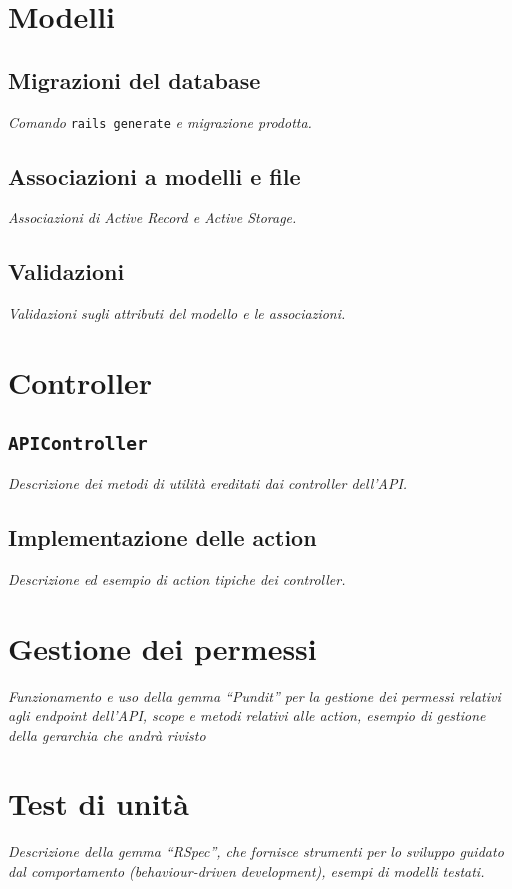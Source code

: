 \section{Modelli}
\subsection{Migrazioni del database}
\emph{Comando} \texttt{rails generate} \emph{e migrazione prodotta.}

\subsection{Associazioni a modelli e file}
\emph{Associazioni di Active Record e Active Storage.}

\subsection{Validazioni}
\emph{Validazioni sugli attributi del modello e le associazioni.}

\section{Controller}
\subsection{\texttt{APIController}}
\emph{Descrizione dei metodi di utilità ereditati dai controller dell'API.}

\subsection{Implementazione delle action}
\emph{Descrizione ed esempio di action tipiche dei controller.}

\section{Gestione dei permessi}
\emph{Funzionamento e uso della gemma ``Pundit'' per la gestione dei permessi relativi agli endpoint dell'API, scope e metodi relativi alle action, esempio di gestione della gerarchia che andrà rivisto}

\section{Test di unità}
\emph{Descrizione della gemma ``RSpec'', che fornisce strumenti per lo sviluppo guidato dal comportamento (behaviour-driven development), esempi di modelli testati.}
